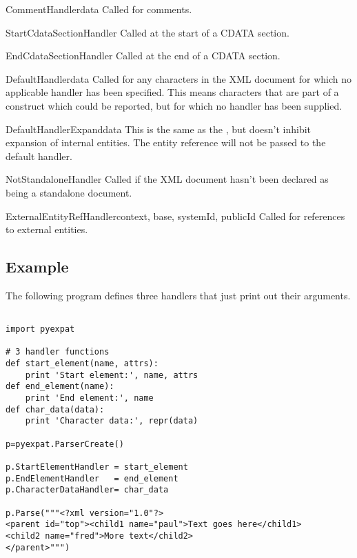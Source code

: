 \begin{methoddesc}{CommentHandler}{data}
Called for comments.
\end{methoddesc}

\begin{methoddesc}{StartCdataSectionHandler}{}
Called at the start of a CDATA section.
\end{methoddesc}

\begin{methoddesc}{EndCdataSectionHandler}{}
Called at the end of a CDATA section.
\end{methoddesc}

\begin{methoddesc}{DefaultHandler}{data}
Called for any characters in the XML document for
which no applicable handler has been specified.  This means
characters that are part of a construct which could be reported, but
for which no handler has been supplied. 
\end{methoddesc}

\begin{methoddesc}{DefaultHandlerExpand}{data}
This is the same as the , 
but doesn't inhibit expansion of internal entities.
The entity reference will not be passed to the default handler.
\end{methoddesc}

\begin{methoddesc}{NotStandaloneHandler}{}
Called if the XML document hasn't been declared as being a standalone document.
\end{methoddesc}

\begin{methoddesc}{ExternalEntityRefHandler}{context, base, systemId, publicId}
Called for references to external entities.  
\end{methoddesc}


\subsection{Example \label{pyexpat-example}}

The following program defines three handlers that just print out their
arguments.

\begin{verbatim}

import pyexpat

# 3 handler functions
def start_element(name, attrs):
    print 'Start element:', name, attrs
def end_element(name):
    print 'End element:', name
def char_data(data):
    print 'Character data:', repr(data)

p=pyexpat.ParserCreate()

p.StartElementHandler = start_element
p.EndElementHandler   = end_element
p.CharacterDataHandler= char_data

p.Parse("""<?xml version="1.0"?>
<parent id="top"><child1 name="paul">Text goes here</child1>
<child2 name="fred">More text</child2>
</parent>""")
\end{verbatim}

